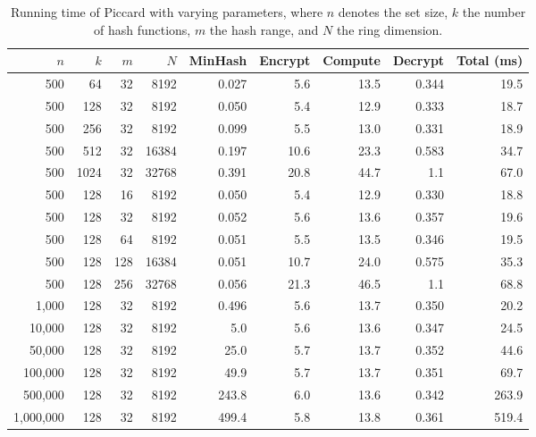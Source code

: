 \begin{table}[t]
\centering
\caption{Running time of Piccard with varying parameters, where $n$ denotes the set size, $k$ the number of hash functions, $m$ the hash range, and $N$ the ring dimension.}
\label{tab:piccard-params}
\begin{tabular}{rrrrrrrrr}
\toprule
$n$ & $k$ & $m$ & $N$ & MinHash & Encrypt & Compute & Decrypt & Total (ms) \\
\midrule
500 & 64 & 32 & 8192 & 0.027 & 5.6 & 13.5 & 0.344 & 19.5 \\
500 & 128 & 32 & 8192 & 0.050 & 5.4 & 12.9 & 0.333 & 18.7 \\
500 & 256 & 32 & 8192 & 0.099 & 5.5 & 13.0 & 0.331 & 18.9 \\
500 & 512 & 32 & 16384 & 0.197 & 10.6 & 23.3 & 0.583 & 34.7 \\
500 & 1024 & 32 & 32768 & 0.391 & 20.8 & 44.7 & 1.1 & 67.0 \\
500 & 128 & 16 & 8192 & 0.050 & 5.4 & 12.9 & 0.330 & 18.8 \\
500 & 128 & 32 & 8192 & 0.052 & 5.6 & 13.6 & 0.357 & 19.6 \\
500 & 128 & 64 & 8192 & 0.051 & 5.5 & 13.5 & 0.346 & 19.5 \\
500 & 128 & 128 & 16384 & 0.051 & 10.7 & 24.0 & 0.575 & 35.3 \\
500 & 128 & 256 & 32768 & 0.056 & 21.3 & 46.5 & 1.1 & 68.8 \\
1,000 & 128 & 32 & 8192 & 0.496 & 5.6 & 13.7 & 0.350 & 20.2 \\
10,000 & 128 & 32 & 8192 & 5.0 & 5.6 & 13.6 & 0.347 & 24.5 \\
50,000 & 128 & 32 & 8192 & 25.0 & 5.7 & 13.7 & 0.352 & 44.6 \\
100,000 & 128 & 32 & 8192 & 49.9 & 5.7 & 13.7 & 0.351 & 69.7 \\
500,000 & 128 & 32 & 8192 & 243.8 & 6.0 & 13.6 & 0.342 & 263.9 \\
1,000,000 & 128 & 32 & 8192 & 499.4 & 5.8 & 13.8 & 0.361 & 519.4 \\
\bottomrule
\end{tabular}
\end{table}


